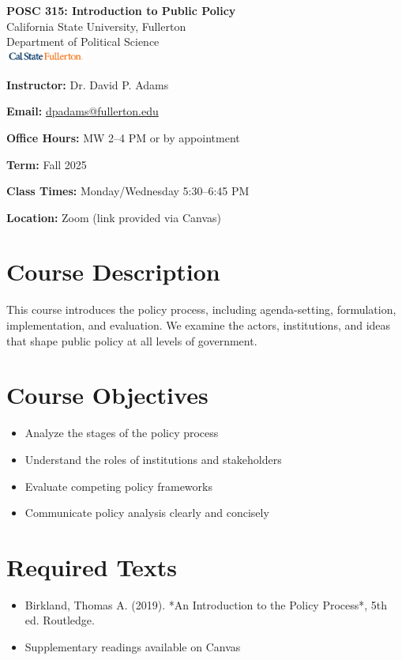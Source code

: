 \documentclass[11pt]{article}
\newcommand{\syllabusField}[2]{\textbf{#1:} #2\par\medskip}
\begin{document}
\begin{center}
  {\LARGE\textbf{POSC 315: Introduction to Public Policy}}\\[0.5em]
  {\large California State University, Fullerton}\\
  {\large Department of Political Science}\\[1em]
  \includegraphics[width=0.2\textwidth, alt={CSUF logo}]{csuf_logo.png}
\end{center}
\vspace{1em}

\syllabusField{Instructor}{Dr. David P. Adams}
\syllabusField{Email}{\href{mailto:dpadams@fullerton.edu}{dpadams@fullerton.edu}}
\syllabusField{Office Hours}{MW 2–4 PM or by appointment}
\syllabusField{Term}{Fall 2025}
\syllabusField{Class Times}{Monday/Wednesday 5:30–6:45 PM}
\syllabusField{Location}{Zoom (link provided via Canvas)}

\section*{Course Description}
This course introduces the policy process, including agenda-setting, formulation, implementation, and evaluation. We examine the actors, institutions, and ideas that shape public policy at all levels of government.

\section*{Course Objectives}
\begin{itemize}[leftmargin=1.5em]
  \item Analyze the stages of the policy process
  \item Understand the roles of institutions and stakeholders
  \item Evaluate competing policy frameworks
  \item Communicate policy analysis clearly and concisely
\end{itemize}

\section*{Required Texts}
\begin{itemize}[leftmargin=1.5em]
  \item Birkland, Thomas A. (2019). *An Introduction to the Policy Process*, 5th ed. Routledge.
  \item Supplementary readings available on Canvas
\end{itemize}
\end{document}
